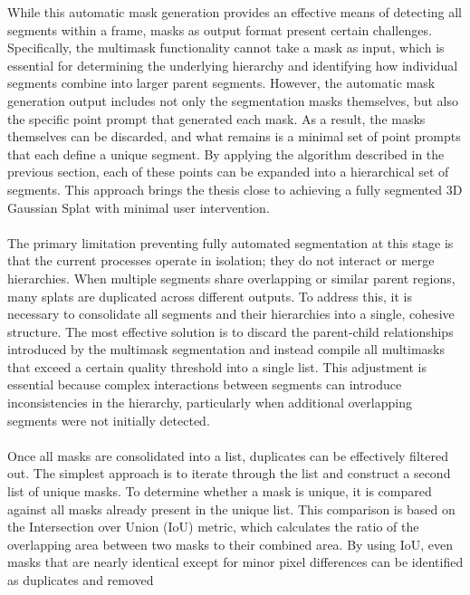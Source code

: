 \documentclass[12pt]{article}
\begin{document}
\FloatBarrier
\noindent
While this automatic mask generation provides an effective means of detecting all segments within a frame, masks as output format present certain challenges. Specifically, the multimask functionality cannot take a mask as input, which is essential for determining the underlying hierarchy and identifying how individual segments combine into larger parent segments. However, the automatic mask generation output includes not only the segmentation masks themselves, but also the specific point prompt that generated each mask. As a result, the masks themselves can be discarded, and what remains is a minimal set of point prompts that each define a unique segment. By applying the algorithm described in the previous section, each of these points can be expanded into a hierarchical set of segments. This approach brings the thesis close to achieving a fully segmented 3D Gaussian Splat with minimal user intervention.
\\\\
The primary limitation preventing fully automated segmentation at this stage is that the current processes operate in isolation; they do not interact or merge hierarchies. When multiple segments share overlapping or similar parent regions, many splats are duplicated across different outputs. To address this, it is necessary to consolidate all segments and their hierarchies into a single, cohesive structure. The most effective solution is to discard the parent-child relationships introduced by the multimask segmentation and instead compile all multimasks that exceed a certain quality threshold into a single list. This adjustment is essential because complex interactions between segments can introduce inconsistencies in the hierarchy, particularly when additional overlapping segments were not initially detected.
\\\\
Once all masks are consolidated into a list, duplicates can be effectively filtered out. The simplest approach is to iterate through the list and construct a second list of unique masks. To determine whether a mask is unique, it is compared against all masks already present in the unique list. This comparison is based on the Intersection over Union (IoU) metric, which calculates the ratio of the overlapping area between two masks to their combined area. By using IoU, even masks that are nearly identical except for minor pixel differences can be identified as duplicates and removed
\\\\
\end{document}

